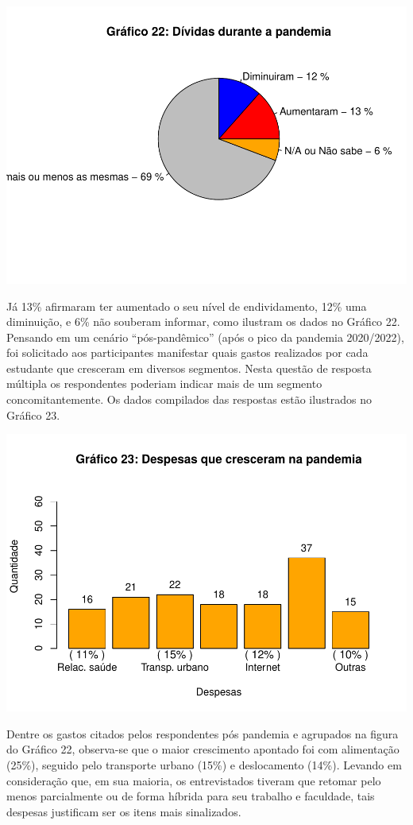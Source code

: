 \documentclass[
]{article}
\begin{document}
\includegraphics{consequencias-oriundas-da-pandemia-v1.0_files/figure-latex/grafico-22-1.pdf}

Já 13\% afirmaram ter aumentado o seu nível de endividamento, 12\% uma
diminuição, e 6\% não souberam informar, como ilustram os dados no
Gráfico 22. Pensando em um cenário ``pós-pandêmico'' (após o pico da
pandemia 2020/2022), foi solicitado aos participantes manifestar quais
gastos realizados por cada estudante que cresceram em diversos
segmentos. Nesta questão de resposta múltipla os respondentes poderiam
indicar mais de um segmento concomitantemente. Os dados compilados das
respostas estão ilustrados no Gráfico 23.

\includegraphics{consequencias-oriundas-da-pandemia-v1.0_files/figure-latex/grafico-23-1.pdf}

Dentre os gastos citados pelos respondentes pós pandemia e agrupados na
figura do Gráfico 22, observa-se que o maior crescimento apontado foi
com alimentação (25\%), seguido pelo transporte urbano (15\%) e
deslocamento (14\%). Levando em consideração que, em sua maioria, os
entrevistados tiveram que retomar pelo menos parcialmente ou de forma
híbrida para seu trabalho e faculdade, tais despesas justificam ser os
itens mais sinalizados.
\end{document}

